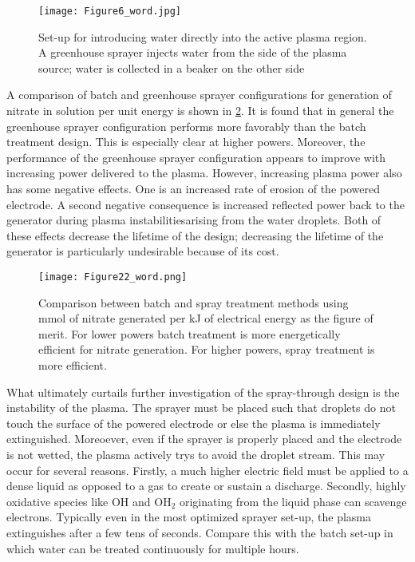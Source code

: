 \begin{figure}[htbp]
  \centering
  \texttt{[image: Figure6\_word.jpg]}
  \caption{Set-up for introducing water directly into the active plasma region.  A greenhouse sprayer injects water from the side of the plasma source; water is collected in a beaker on the other side}
  \label{fig:spray_scheme}
\end{figure}

A comparison of batch and greenhouse sprayer configurations for generation of nitrate in solution per unit energy is shown in \cref{fig:nitro_compare_power_design}. It is found that in general the greenhouse sprayer configuration performs more favorably than the batch treatment design. This is especially clear at higher powers. Moreover, the performance of the greenhouse sprayer configuration appears to improve with increasing power delivered to the plasma. However, increasing plasma power also has some negative effects. One is an increased rate of erosion of the powered electrode. A second negative consequence is increased reflected power back to the generator during plasma instabilitiesarising from the water droplets. Both of these effects decrease the lifetime of the design; decreasing the lifetime of the generator is particularly undesirable because of its cost.

\begin{figure}[htbp]
  \centering
  \texttt{[image: Figure22\_word.png]}
  \caption{Comparison between batch and spray treatment methods using mmol of nitrate generated per kJ of electrical energy as the figure of merit.  For lower powers batch treatment is more energetically efficient for nitrate generation.  For higher powers, spray treatment is more efficient.}
  \label{fig:nitro_compare_power_design}
\end{figure}

What ultimately curtails further investigation of the spray-through design is the instability of the plasma. The sprayer must be placed such that droplets do not touch the surface of the powered electrode or else the plasma is immediately extinguished. Moreoever, even if the sprayer is properly placed and the electrode is not wetted, the plasma actively trys to avoid the droplet stream. This may occur for several reasons. Firstly, a much higher electric field must be applied to a dense liquid as opposed to a gas to create or sustain a discharge. Secondly, highly oxidative species like OH and OH$_2$ originating from the liquid phase can scavenge electrons. Typically even in the most optimized sprayer set-up, the plasma extinguishes after a few tens of seconds. Compare this with the batch set-up in which water can be treated continuously for multiple hours.

